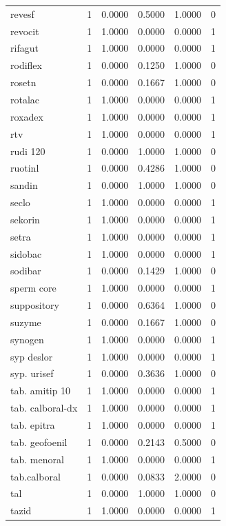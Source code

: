 \begin{longtable}{p{3.0cm}rrrrr}
revesf & 1 & 0.0000 & 0.5000 & 1.0000 & 0 \\
revocit & 1 & 1.0000 & 0.0000 & 0.0000 & 1 \\
rifagut & 1 & 1.0000 & 0.0000 & 0.0000 & 1 \\
rodiflex & 1 & 0.0000 & 0.1250 & 1.0000 & 0 \\
rosetn & 1 & 0.0000 & 0.1667 & 1.0000 & 0 \\
rotalac & 1 & 1.0000 & 0.0000 & 0.0000 & 1 \\
roxadex & 1 & 1.0000 & 0.0000 & 0.0000 & 1 \\
rtv & 1 & 1.0000 & 0.0000 & 0.0000 & 1 \\
rudi 120 & 1 & 0.0000 & 1.0000 & 1.0000 & 0 \\
ruotinl & 1 & 0.0000 & 0.4286 & 1.0000 & 0 \\
sandin & 1 & 0.0000 & 1.0000 & 1.0000 & 0 \\
seclo & 1 & 1.0000 & 0.0000 & 0.0000 & 1 \\
sekorin & 1 & 1.0000 & 0.0000 & 0.0000 & 1 \\
setra & 1 & 1.0000 & 0.0000 & 0.0000 & 1 \\
sidobac & 1 & 1.0000 & 0.0000 & 0.0000 & 1 \\
sodibar & 1 & 0.0000 & 0.1429 & 1.0000 & 0 \\
sperm core & 1 & 1.0000 & 0.0000 & 0.0000 & 1 \\
suppository & 1 & 0.0000 & 0.6364 & 1.0000 & 0 \\
suzyme & 1 & 0.0000 & 0.1667 & 1.0000 & 0 \\
synogen & 1 & 1.0000 & 0.0000 & 0.0000 & 1 \\
syp deslor & 1 & 1.0000 & 0.0000 & 0.0000 & 1 \\
syp. urisef & 1 & 0.0000 & 0.3636 & 1.0000 & 0 \\
tab. amitip 10 & 1 & 1.0000 & 0.0000 & 0.0000 & 1 \\
tab. calboral-dx & 1 & 1.0000 & 0.0000 & 0.0000 & 1 \\
tab. epitra & 1 & 1.0000 & 0.0000 & 0.0000 & 1 \\
tab. geofoenil & 1 & 0.0000 & 0.2143 & 0.5000 & 0 \\
tab. menoral & 1 & 1.0000 & 0.0000 & 0.0000 & 1 \\
tab.calboral & 1 & 0.0000 & 0.0833 & 2.0000 & 0 \\
tal & 1 & 0.0000 & 1.0000 & 1.0000 & 0 \\
tazid & 1 & 1.0000 & 0.0000 & 0.0000 & 1 \\

\end{longtable}
